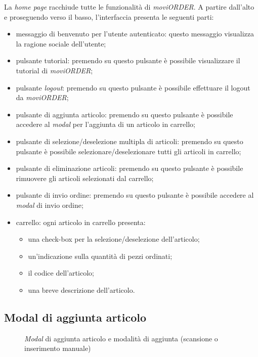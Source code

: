 La \textit{home page} racchiude tutte le funzionalità di \textit{moviORDER}. A partire dall'alto e proseguendo verso il basso, l'interfaccia presenta le seguenti parti:
\begin{itemize}
	\item messaggio di benvenuto per l'utente autenticato: questo messaggio visualizza la ragione sociale dell'utente;
	\item pulsante tutorial: premendo su questo pulsante è possibile visualizzare il tutorial di \textit{moviORDER};
	\item pulsante \textit{logout}: premendo su questo pulsante è possibile effettuare il logout da \textit{moviORDER};
	\item pulsante di aggiunta articolo: premendo su questo pulsante è possibile accedere al \textit{modal} per l'aggiunta di un articolo in carrello; 
	\item pulsante di selezione/deselezione multipla di articoli: premendo su questo pulsante è possibile selezionare/deselezionare tutti gli articoli in carrello;
	\item pulsante di eliminazione articoli: premendo su questo pulsante è possibile rimuovere gli articoli selezionati dal carrello;
	\item pulsante di invio ordine: premendo su questo pulsante è possibile accedere al \textit{modal} di invio ordine;
	\item carrello: ogni articolo in carrello presenta:
	\begin{itemize}
		\item una check-box per la selezione/deselezione dell'articolo;
		\item un'indicazione sulla quantità di pezzi ordinati;
		\item il codice dell'articolo;
		\item una breve descrizione dell'articolo.
	\end{itemize}
\end{itemize}

\subsection{Modal di aggiunta articolo}

\begin{figure}[!h] 
    \centering 
    \caption{\textit{Modal} di aggiunta articolo e modalità di aggiunta (scansione o inserimento manuale)}
\end{figure}


